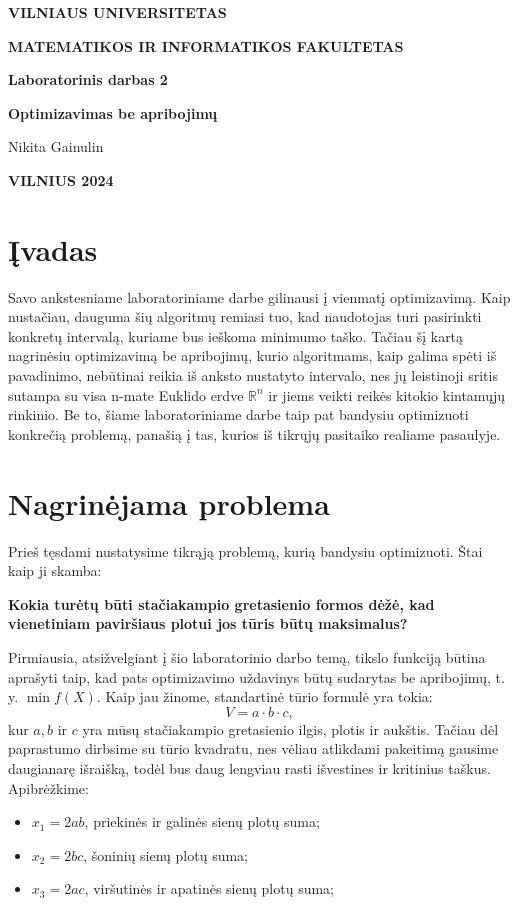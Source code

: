 \documentclass{article}
\begin{document}
\newlength{\mywidth}
\settowidth{\mywidth}{Darbo vadovas:}
\begin{titlepage}
    \vskip 20pt
    \centerline{\bf \large VILNIAUS UNIVERSITETAS}
    \bigskip
    \centerline{\large \textbf{MATEMATIKOS IR INFORMATIKOS FAKULTETAS}}
    \vskip 120pt
    \centerline{\bf \Large \textbf{Laboratorinis darbas 2}}
    \vskip 50pt
    \begin{center}
        {\bf \LARGE Optimizavimas be apribojimų}
    \end{center}
    \bigskip
    \bigskip
    \centerline{\Large Nikita Gainulin}
    \vskip 90pt
    \vskip 200pt
    \centerline{\large \textbf{VILNIUS 2024}}
\end{titlepage}

\tableofcontents

\clearpage
\section{Įvadas}
Savo ankstesniame laboratoriniame darbe gilinausi į vienmatį optimizavimą. Kaip nustačiau, dauguma šių algoritmų remiasi tuo, kad naudotojas turi pasirinkti konkretų intervalą, kuriame bus ieškoma minimumo taško. Tačiau šį kartą nagrinėsiu optimizavimą be apribojimų, kurio algoritmams, kaip galima spėti iš pavadinimo, nebūtinai reikia iš anksto nustatyto intervalo, nes jų leistinoji sritis sutampa su visa n-mate Euklido erdve $\mathbb{R}^n$ ir jiems veikti reikės kitokio kintamųjų rinkinio. Be to, šiame laboratoriniame darbe taip pat bandysiu optimizuoti konkrečią problemą, panašią į tas, kurios iš tikrųjų pasitaiko realiame pasaulyje.
\section{Nagrinėjama problema}
Prieš tęsdami nustatysime tikrąją problemą, kurią bandysiu optimizuoti. Štai kaip ji skamba:

\textbf{Kokia turėtų būti stačiakampio gretasienio formos dėžė, kad vienetiniam paviršiaus plotui jos tūris būtų maksimalus?}

Pirmiausia, atsižvelgiant į šio laboratorinio darbo temą, tikslo funkciją būtina aprašyti taip, kad pats optimizavimo uždavinys būtų sudarytas be apribojimų, t. y. $\min f(X)$. Kaip jau žinome, standartinė tūrio formulė yra tokia:
\begin{equation*}
    V = a\cdot b\cdot c,
\end{equation*}
kur $a, b$ ir $c$ yra mūsų stačiakampio gretasienio ilgis, plotis ir aukštis. Tačiau dėl paprastumo dirbsime su tūrio kvadratu, nes vėliau atlikdami pakeitimą gausime daugianarę išraišką, todėl bus daug lengviau rasti išvestines ir kritinius taškus. Apibrėžkime:
\begin{itemize}
    \item $x_{1} = 2ab$, priekinės ir galinės sienų plotų suma;
    \item $x_{2} = 2bc$, šoninių sienų plotų suma;
    \item $x_{3} = 2ac$, viršutinės ir apatinės sienų plotų suma;
\end{itemize}
\end{document}

